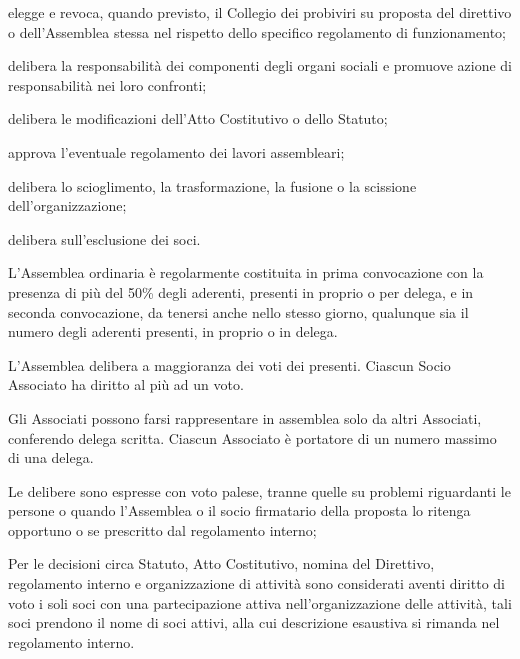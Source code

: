 \documentclass[legalpaper, 11pt]{exam}
\let\tempone\enumerate
\let\temptwo\endenumerate
\renewenvironment{enumerate}{\tempone\addtolength{\itemsep}{-0.45\baselineskip}}{\temptwo}
\begin{document}
{\begin{enumerate}
\begin{enumerate}
		\item elegge e revoca, quando previsto, il Collegio dei probiviri su proposta del direttivo o dell’Assemblea stessa nel rispetto dello specifico regolamento di funzionamento;
		\item delibera la responsabilità dei componenti degli organi sociali e promuove azione di responsabilità nei loro confronti;
		\item delibera le modificazioni dell’Atto Costitutivo o dello Statuto;
		\item approva l’eventuale regolamento dei lavori assembleari;
		\item delibera lo scioglimento, la trasformazione, la fusione o la scissione dell’organizzazione;
		\item delibera sull’esclusione dei soci.
	\end{enumerate}
	\item L’Assemblea ordinaria è regolarmente costituita in prima convocazione con la presenza di più del 50\% degli aderenti, presenti in proprio o per delega, e in seconda convocazione, da tenersi anche nello stesso giorno, qualunque sia il numero degli aderenti presenti, in proprio o in delega.
	\item L’Assemblea delibera a maggioranza dei voti dei presenti. Ciascun Socio Associato ha diritto al più ad un voto.
	\item Gli Associati possono farsi rappresentare in assemblea solo da altri Associati, conferendo delega scritta. Ciascun Associato è portatore di un numero massimo di una delega.
	\item Le delibere sono espresse con voto palese, tranne quelle su problemi riguardanti le persone o quando l’Assemblea o il socio firmatario della proposta lo ritenga opportuno o se prescritto dal regolamento interno;
	\item Per le decisioni circa Statuto, Atto Costitutivo, nomina del Direttivo, regolamento interno e organizzazione di attività sono considerati aventi diritto di voto i soli soci con una partecipazione attiva nell’organizzazione delle attività, tali soci prendono il nome di soci attivi, alla cui descrizione esaustiva si rimanda nel regolamento interno.


\end{enumerate}

}
\end{document}
